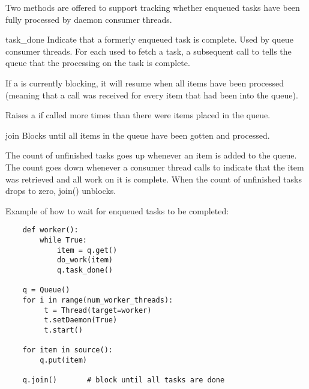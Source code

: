 Two methods are offered to support tracking whether enqueued tasks have
been fully processed by daemon consumer threads.

\begin{methoddesc}[Queue]{task_done}{}
Indicate that a formerly enqueued task is complete.  Used by queue consumer
threads.  For each  used to fetch a task, a subsequent call to
 tells the queue that the processing on the task is complete.

If a  is currently blocking, it will resume when all items
have been processed (meaning that a  call was received
for every item that had been  into the queue).

Raises a  if called more times than there were items
placed in the queue.
\end{methoddesc}

\begin{methoddesc}[Queue]{join}{}
Blocks until all items in the queue have been gotten and processed.

The count of unfinished tasks goes up whenever an item is added to the
queue. The count goes down whenever a consumer thread calls 
to indicate that the item was retrieved and all work on it is complete.
When the count of unfinished tasks drops to zero, join() unblocks.
\end{methoddesc}

Example of how to wait for enqueued tasks to be completed:

\begin{verbatim}
    def worker(): 
        while True: 
            item = q.get() 
            do_work(item) 
            q.task_done() 

    q = Queue() 
    for i in range(num_worker_threads): 
         t = Thread(target=worker)
         t.setDaemon(True)
         t.start() 

    for item in source():
        q.put(item) 

    q.join()       # block until all tasks are done
\end{verbatim}
